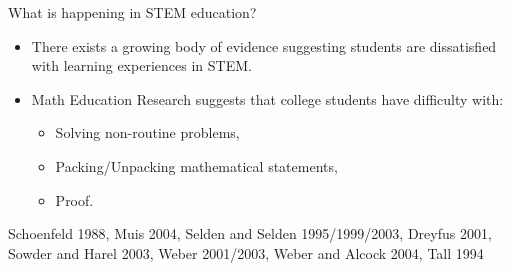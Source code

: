 \documentclass[10pt,handout]{beamer}
\begin{document}
\begin{frame}

\begin{block}{What is happening in STEM education?}
\begin{itemize}
\item There exists a growing body of evidence suggesting students are dissatisfied with learning experiences in STEM.
\item Math Education Research suggests that college students have difficulty with:
    \begin{itemize}\normalsize
    \item Solving non-routine problems,
    \item Packing/Unpacking mathematical statements,
    \item Proof.
    \end{itemize}
\end{itemize}

\vspace{1em}

Schoenfeld 1988, Muis 2004, Selden and Selden 1995/1999/2003, Dreyfus 2001, Sowder and Harel 2003, Weber 2001/2003, Weber and Alcock 2004, Tall 1994

\end{block}

\end{frame}

\end{document}
